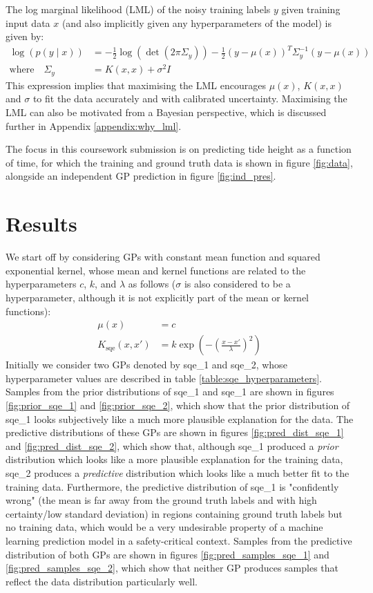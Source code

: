 \documentclass{article}
\begin{document}
The log marginal likelihood (LML) of the noisy training labels $y$ given training input data $x$ (and also implicitly given any hyperparameters of the model) is given by:
\begin{align}
    \log \left( p(y \mid x) \right) &= -\frac{1}{2}\log\left(\det \left(2\pi \Sigma_y \right)\right) -\frac{1}{2}(y - \mu(x))^T \Sigma_y^{-1} (y - \mu(x)) \\
    \text{where} \quad \Sigma_y &= K(x, x) + \sigma^2 I
\end{align}
This expression implies that maximising the LML encourages $\mu(x)$, $K(x,x)$ and $\sigma$ to fit the data accurately and with calibrated uncertainty. Maximising the LML can also be motivated from a Bayesian perspective, which is discussed further in Appendix \ref{appendix:why_lml}.

The focus in this coursework submission is on predicting tide height as a function of time, for which the training and ground truth data is shown in figure \ref{fig:data}, alongside an independent GP prediction in figure \ref{fig:ind_pres}.
\section{Results}
We start off by considering GPs with constant mean function and squared exponential kernel, whose mean and kernel functions are related to the hyperparameters $c$, $k$, and $\lambda$ as follows ($\sigma$ is also considered to be a hyperparameter, although it is not explicitly part of the mean or kernel functions):
\begin{align}
\mu(x) &= c \\
K_{\mathrm{sqe}}(x, x') &= k \exp\left( -\left( \frac{x - x'}{\lambda} \right)^2 \right)
\end{align}
Initially we consider two GPs denoted by sqe\_1 and sqe\_2, whose hyperparameter values are described in table \ref{table:sqe_hyperparameters}. Samples from the prior distributions of sqe\_1 and sqe\_1 are shown in figures \ref{fig:prior_sqe_1} and \ref{fig:prior_sqe_2}, which show that the prior distribution of sqe\_1 looks subjectively like a much more plausible explanation for the data. The predictive distributions of these GPs are shown in figures \ref{fig:pred_dist_sqe_1} and \ref{fig:pred_dist_sqe_2}, which show that, although sqe\_1 produced a \emph{prior} distribution which looks like a more plausible explanation for the training data, sqe\_2 produces a \emph{predictive} distribution which looks like a much better fit to the training data. Furthermore, the predictive distribution of sqe\_1 is "confidently wrong" (the mean is far away from the ground truth labels and with high certainty/low standard deviation) in regions containing ground truth labels but no training data, which would be a very undesirable property of a machine learning prediction model in a safety-critical context. Samples from the predictive distribution of both GPs are shown in figures \ref{fig:pred_samples_sqe_1} and \ref{fig:pred_samples_sqe_2}, which show that neither GP produces samples that reflect the data distribution particularly well.
\end{document}
